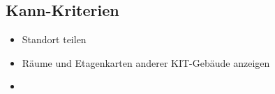 \subsection{Kann-Kriterien}

\begin{itemize}

    \item Standort teilen 
    \item Räume und Etagenkarten anderer KIT-Gebäude anzeigen
    \item 

\end{itemize}